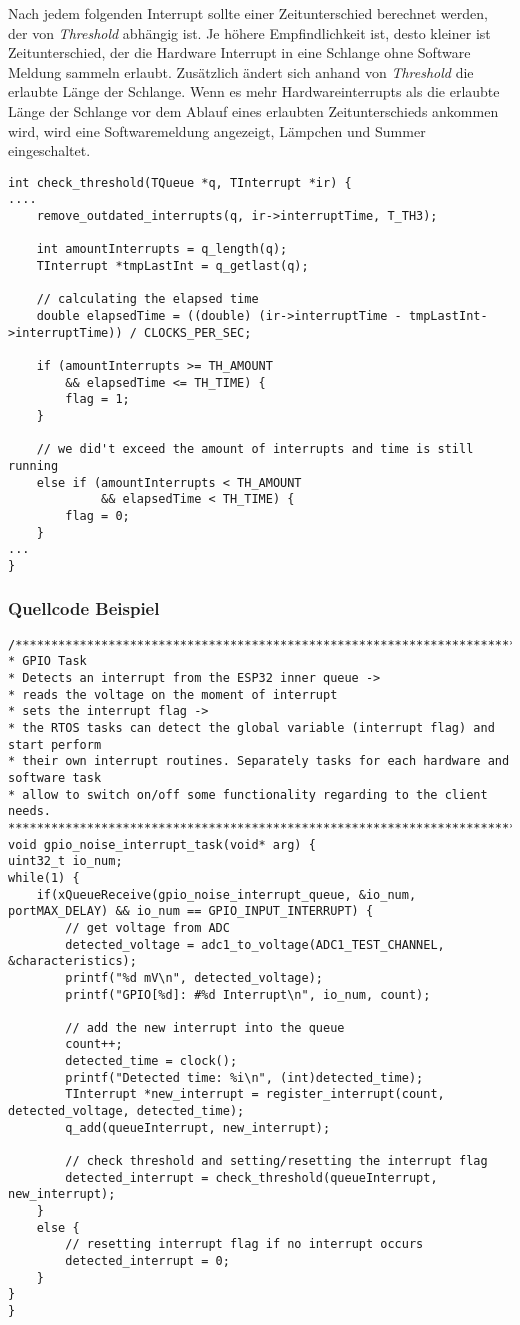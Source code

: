 Nach jedem folgenden Interrupt sollte einer Zeitunterschied berechnet werden, der von \textit{Threshold} abhängig ist. Je höhere Empfindlichkeit ist, desto kleiner ist Zeitunterschied, der die Hardware Interrupt in eine Schlange ohne Software Meldung sammeln erlaubt. Zusätzlich ändert sich anhand von \textit{Threshold} die erlaubte Länge der Schlange. Wenn es mehr Hardwareinterrupts als die erlaubte Länge der Schlange vor dem Ablauf eines erlaubten Zeitunterschieds ankommen wird, wird eine Softwaremeldung angezeigt, Lämpchen und Summer eingeschaltet. 
\begin{lstlisting}
int check_threshold(TQueue *q, TInterrupt *ir) {
....
	remove_outdated_interrupts(q, ir->interruptTime, T_TH3);
	
	int amountInterrupts = q_length(q);
	TInterrupt *tmpLastInt = q_getlast(q);
	
	// calculating the elapsed time
	double elapsedTime = ((double) (ir->interruptTime - tmpLastInt->interruptTime)) / CLOCKS_PER_SEC;

	if (amountInterrupts >= TH_AMOUNT 
	    && elapsedTime <= TH_TIME) {
		flag = 1;
	}
	
	// we did't exceed the amount of interrupts and time is still running
	else if (amountInterrupts < TH_AMOUNT 
	         && elapsedTime < TH_TIME) {
		flag = 0;
	}
...
}

\end{lstlisting}

\subsubsection{Quellcode Beispiel}
\begin{lstlisting}
/****************************************************************************
* GPIO Task
* Detects an interrupt from the ESP32 inner queue ->
* reads the voltage on the moment of interrupt
* sets the interrupt flag ->
* the RTOS tasks can detect the global variable (interrupt flag) and start perform
* their own interrupt routines. Separately tasks for each hardware and software task
* allow to switch on/off some functionality regarding to the client needs.
****************************************************************************/
void gpio_noise_interrupt_task(void* arg) {
uint32_t io_num;
while(1) {
	if(xQueueReceive(gpio_noise_interrupt_queue, &io_num, portMAX_DELAY) && io_num == GPIO_INPUT_INTERRUPT) {
		// get voltage from ADC
		detected_voltage = adc1_to_voltage(ADC1_TEST_CHANNEL, &characteristics);
		printf("%d mV\n", detected_voltage);
		printf("GPIO[%d]: #%d Interrupt\n", io_num, count);
		
		// add the new interrupt into the queue
		count++;
		detected_time = clock();
		printf("Detected time: %i\n", (int)detected_time);
		TInterrupt *new_interrupt = register_interrupt(count, detected_voltage, detected_time);
		q_add(queueInterrupt, new_interrupt);
			
		// check threshold and setting/resetting the interrupt flag
		detected_interrupt = check_threshold(queueInterrupt, new_interrupt);
	}
	else {
		// resetting interrupt flag if no interrupt occurs
		detected_interrupt = 0;
	}
}
}
\end{lstlisting}

